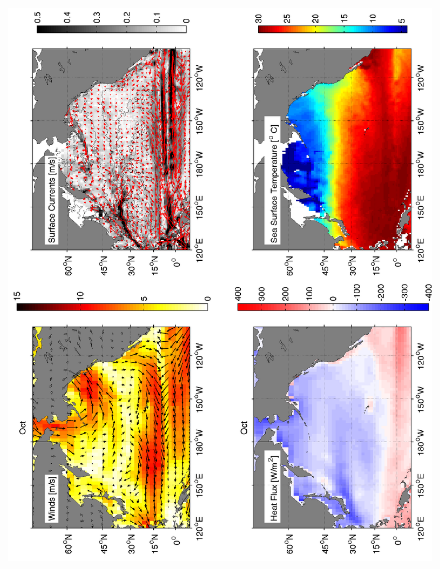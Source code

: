 \begin{figure}[hbt]
  \begin{center}
  \includegraphics[angle=270]{figs/WindOverview/SurfaceCurrents10}
    \caption{}
    \label{fig:}  
  \end{center}
\end{figure}

